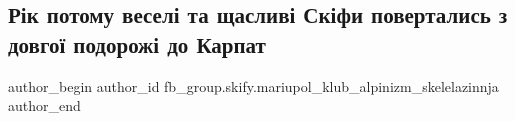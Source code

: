 
 
 
 
 
 
\subsection{Рік потому веселі та щасливі Скіфи повертались з довгої подорожі до Карпат}
\label{sec:24_02_2023.fb.fb_group.skify.mariupol_klub_alpinizm_skelelazinnja.1.karpaty_rik_tomu}
 
\ifcmt
 author_begin
   author_id fb_group.skify.mariupol_klub_alpinizm_skelelazinnja
 author_end
\fi
